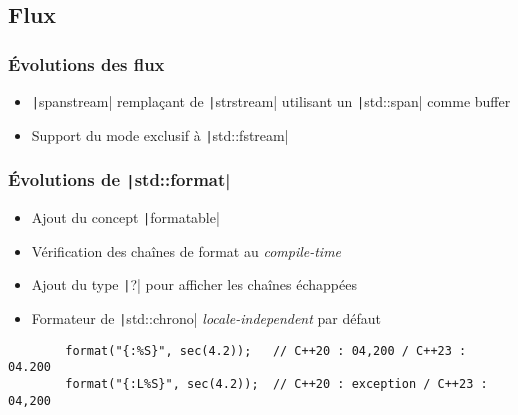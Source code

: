 \documentclass[C++.tex]{subfiles}
\begin{document}
\subsection*{Flux}
\begin{frame}[fragile]
	\frametitle{Évolutions des flux}
	\begin{itemize}
		\item \texttt|spanstream| remplaçant de \texttt|strstream| utilisant un \texttt|std::span| comme buffer


		\item Support du mode exclusif à \texttt|std::fstream|
	\end{itemize}

\end{frame}

\begin{frame}[fragile]
	\frametitle{Évolutions de \texttt|std::format|}
	\begin{itemize}
		\item Ajout du concept \texttt|formatable|
		\item Vérification des chaînes de format au \textit{compile-time}
		\item Ajout du type \texttt|?| pour afficher les chaînes échappées
		\item Formateur de \texttt|std::chrono| \textit{locale-independent} par défaut

	\end{itemize}

	\begin{verbatim}
		format("{:%S}", sec(4.2));   // C++20 : 04,200 / C++23 : 04.200
		format("{:L%S}", sec(4.2));  // C++20 : exception / C++23 : 04,200
	\end{verbatim}

\end{frame}
\end{document}
